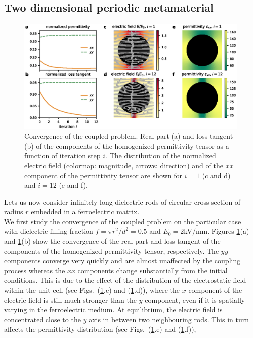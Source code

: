 \documentclass[openacc]{rsproca_new}%
\begin{document}
\subsection{Two dimensional periodic metamaterial}
\begin{figure}[!t]
\centering
\includegraphics[width=1\textwidth]{conv_per}
\caption{Convergence of the coupled problem.
Real part (a) and loss tangent (b) of the components of the homogenized
 permittivity tensor as a function of iteration step $i$. The distribution of
 the normalized electric field (colormap: magnitude, arrows: direction) and of the
 $xx$ component of the permittivity tensor are shown for $i=1$
  (c and d) and $i=12$ (e and f).
 }
\label{conv2D}
\end{figure}
Lets us now consider infinitely long dielectric rods of circular cross section
of radius $r$ embedded in a ferroelectric matrix.\\
We first study the convergence of the coupled problem on the particular case with dielectric
filling fraction $f=\pi r^2/d^2=0.5$ and $E_0=2$kV/mm. Figures \ref{conv2D}(a) and \ref{conv2D}(b) show the
convergence of the real part and loss tangent of the components of the homogenized
 permittivity tensor, respectively. The $yy$ components converge very quickly
 and are almost unaffected by the coupling process whereas the
 $xx$ components change substantially from the initial conditions.
 This is due to the effect of the distribution
 of the electrostatic field within the unit cell (see Figs.~(\ref{conv2D}.c) and (\ref{conv2D}.d)),
 where the $x$ component of the electric field is still much stronger
 than the $y$ component, even if it is spatially varying in the ferroelectric medium.
 At equilibrium, the electric field is concentrated close to the $y$ axis in between two neighbouring
 rods. This in turn affects the permittivity distribution (see Figs.~(\ref{conv2D}.e) and (\ref{conv2D}.f)),
\end{document}
